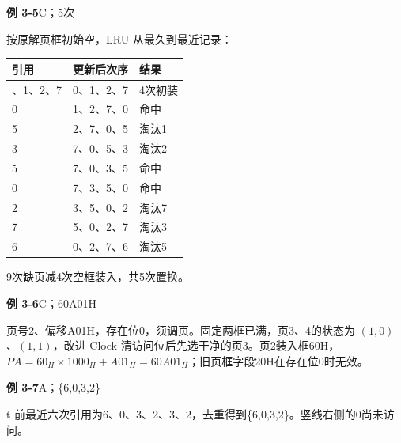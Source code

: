 \documentclass{sidenotes-simplex}
\begin{document}
\par\medskip\Needspace{30.00mm}\noindent{}\label{a:OS03-E05}\textbf{例 3-5}\quad C；5次
\par\smallskip
按原解页框初始空，LRU 从最久到最近记录：

\begin{longtable}[]{@{}lll@{}}
\toprule\noalign{}
引用 & 更新后次序 & 结果 \\
\midrule\noalign{}
\endhead
\bottomrule\noalign{}
\endlastfoot
0、1、2、7 & 0、1、2、7 & 4次初装 \\
0 & 1、2、7、0 & 命中 \\
5 & 2、7、0、5 & 淘汰1 \\
3 & 7、0、5、3 & 淘汰2 \\
5 & 7、0、3、5 & 命中 \\
0 & 7、3、5、0 & 命中 \\
2 & 3、5、0、2 & 淘汰7 \\
7 & 5、0、2、7 & 淘汰3 \\
6 & 0、2、7、6 & 淘汰5 \\
\end{longtable}

9次缺页减4次空框装入，共5次置换。

\par\medskip\Needspace{30.00mm}\noindent{}\label{a:OS03-E06}\textbf{例 3-6}\quad C；60A01H
\par\smallskip
页号2、偏移A01H，存在位0，须调页。固定两框已满，页3、4的状态为 \((1,0)\)、\((1,1)\)，改进 Clock 清访问位后先选干净的页3。页2装入框60H，\(PA=60_H\times1000_H+A01_H=60A01_H\)；旧页框字段20H在存在位0时无效。

\par\medskip\Needspace{30.00mm}\noindent{}\label{a:OS03-E07}\textbf{例 3-7}\quad A；\{6,0,3,2\}
\par\smallskip
t 前最近六次引用为6、0、3、2、3、2，去重得到\{6,0,3,2\}。竖线右侧的0尚未访问。
\end{document}
